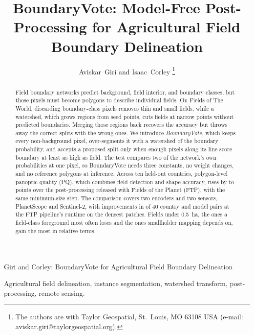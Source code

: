 \documentclass[journal]{IEEEtran}
\begin{document}
\title{BoundaryVote: Model-Free Post-Processing for Agricultural Field Boundary Delineation}
\author{Aviskar~Giri and Isaac~Corley%
\thanks{The authors are with Taylor Geospatial, St.\ Louis, MO 63108 USA
(e-mail: aviskar.giri@taylorgeospatial.org).}}
%
{Giri and Corley: BoundaryVote for Agricultural Field Boundary Delineation}
\maketitle

\begin{abstract}
Field boundary networks predict background, field interior, and boundary classes, but those pixels must become polygons to describe individual fields.
On Fields of The World, discarding boundary-class pixels removes thin and small fields, while a watershed, which grows regions from seed points, cuts fields at narrow points without predicted boundaries.
Merging those regions back recovers the accuracy but throws away the correct splits with the wrong ones.
We introduce \emph{BoundaryVote}, which keeps every non-background pixel, over-segments it with a watershed of the boundary probability, and accepts a proposed split only when enough pixels along its line score boundary at least as high as field.
The test compares two of the network's own probabilities at one pixel, so BoundaryVote needs three constants, no weight changes, and no reference polygons at inference.
Across ten held-out countries, polygon-level panoptic quality (PQ), which combines field detection and shape accuracy, rises by \GainMin{} to \GainMax{} points over the post-processing released with Fields of the Planet (FTP), with the same minimum-size step.
The comparison covers two encoders and two sensors, PlanetScope and Sentinel-2, with improvements in \UpTotal{} of 40 country and model pairs at \OursSlowdown{} the FTP pipeline's runtime on the densest patches.
Fields under 0.5~ha, the ones a field-class foreground most often loses and the ones smallholder mapping depends on, gain the most in relative terms.
\end{abstract}

\begin{IEEEkeywords}
Agricultural field delineation, instance segmentation, watershed transform, post-processing, remote sensing.
\end{IEEEkeywords}
\end{document}
